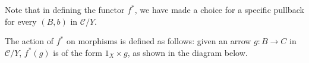 \begin{oss*}
    Note that in defining the functor $f^*$, we have made a choice for a specific pullback for every $(B,b)$ in $\mathcal{C}/Y$.
\end{oss*}

The action of $f^*$ on morphisms is defined as follows: given an arrow $g:B\to C$ in $\mathcal{C}/Y$, $f^*(g)$ is of the form $1_X\times g$, as shown in the diagram below.
\begin{center}
\end{center}

